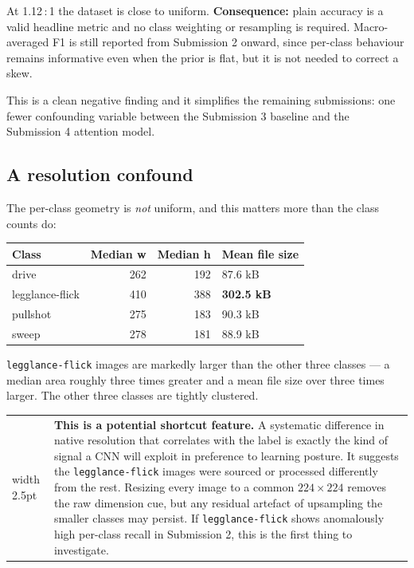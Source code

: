 \documentclass[11pt,a4paper]{article}
\makeatletter
\newenvironment{warnbox}
  {\par\medskip\noindent\begin{tabular}{@{}p{0.3em}@{\hspace{0.8em}}p{\dimexpr\linewidth-2.2em}@{}}
   {\color{warn}\vrule width 2.5pt} &}
  {\end{tabular}\par\medskip}
\makeatother
\begin{document}
At 1.12\,:\,1 the dataset is close to uniform. \textbf{Consequence:} plain accuracy is a
valid headline metric and no class weighting or resampling is required. Macro-averaged
F1 is still reported from Submission 2 onward, since per-class behaviour remains
informative even when the prior is flat, but it is not needed to correct a skew.

This is a clean negative finding and it simplifies the remaining submissions: one fewer
confounding variable between the Submission 3 baseline and the Submission 4 attention
model.

\subsection{A resolution confound}

The per-class geometry is \emph{not} uniform, and this matters more than the class counts
do:

\begin{tabularx}{\linewidth}{@{}>{\ttfamily}p{3.6cm}rrX@{}}
\toprule
\textnormal{\bfseries Class} & \textbf{Median w} & \textbf{Median h} & \textbf{Mean file size} \\
\midrule
drive           & 262 & 192 & 87.6 kB \\
legglance-flick & 410 & 388 & \textbf{302.5 kB} \\
pullshot        & 275 & 183 & 90.3 kB \\
sweep           & 278 & 181 & 88.9 kB \\
\bottomrule
\end{tabularx}

\texttt{legglance-flick} images are markedly larger than the other three classes --- a
median area roughly three times greater and a mean file size over three times larger.
The other three classes are tightly clustered.

\begin{warnbox}
\textbf{This is a potential shortcut feature.} A systematic difference in native
resolution that correlates with the label is exactly the kind of signal a CNN will
exploit in preference to learning posture. It suggests the \texttt{legglance-flick}
images were sourced or processed differently from the rest. Resizing every image to a
common $224 \times 224$ removes the raw dimension cue, but any residual artefact of
upsampling the smaller classes may persist. If \texttt{legglance-flick} shows anomalously
high per-class recall in Submission 2, this is the first thing to investigate.
\end{warnbox}
\end{document}
